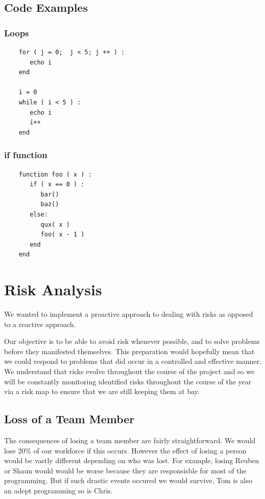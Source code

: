 \documentclass[a4paper,12pt]{article}
\begin{document}
\subsection*{Code Examples}
\begin{multicols}{2}
  \subsubsection*{Loops}
  \begin{lstlisting}
    for ( j = 0;  j < 5; j ++ ) :
       echo i
    end
    
    i = 0
    while ( i < 5 ) :
       echo i
       i++
    end

  \end{lstlisting}
  \columnbreak
  \subsubsection*{if function}
  \begin{lstlisting}
    function foo ( x ) :
       if ( x == 0 ) :
          bar()
          baz()
       else:
          qux( x )
          foo( x - 1 )
       end
    end
  \end{lstlisting}
\end{multicols}

\pagebreak
\section*{Risk Analysis}

We wanted to implement a proactive approach to dealing with risks as opposed to a reactive approach.

Our objective is to be able to avoid risk whenever possible, and to solve problems before they manifested themselves. This preparation would hopefully mean that we could respond to problems that did occur in a controlled and effective manner. We understand that risks evolve throughout the course of the project and so we will be constantly monitoring identified risks throughout the course of the year via a risk map to ensure that we are still keeping them at bay. 

\subsection*{Loss of a Team Member}
The consequences of losing a team member are fairly straightforward. We would lose 20\% of our workforce if this occurs. However the effect of losing a person would be vastly different depending on who was lost. For example, losing Reuben or Shaun would would be worse because they are responsisble for most of the programming. But if such drastic events occured we would survive, Tom is also an adept programming so is Chris.
\end{document}
